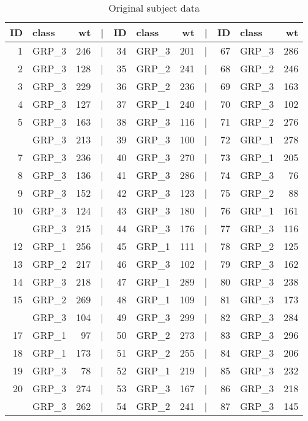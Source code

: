 \documentclass[smallextended]{svjour3}       %
\begin{document}
\begin{table}

\caption{\label{tab:subject-weights}Original subject data}
\centering
\begin{tabular}[t]{rlrlrlrlrlr}
\toprule
ID & class & wt & | & ID & class & wt & | & ID & class & wt\\
\midrule
1 & GRP\_3 & 246 & | & 34 & GRP\_3 & 201 & | & 67 & GRP\_3 & 286\\
2 & GRP\_3 & 128 & | & 35 & GRP\_2 & 241 & | & 68 & GRP\_2 & 246\\
3 & GRP\_3 & 229 & | & 36 & GRP\_2 & 236 & | & 69 & GRP\_3 & 163\\
4 & GRP\_3 & 127 & | & 37 & GRP\_1 & 240 & | & 70 & GRP\_3 & 102\\
5 & GRP\_3 & 163 & | & 38 & GRP\_3 & 116 & | & 71 & GRP\_2 & 276\\
\addlinespace
6 & GRP\_3 & 213 & | & 39 & GRP\_3 & 100 & | & 72 & GRP\_1 & 278\\
7 & GRP\_3 & 236 & | & 40 & GRP\_3 & 270 & | & 73 & GRP\_1 & 205\\
8 & GRP\_3 & 136 & | & 41 & GRP\_3 & 286 & | & 74 & GRP\_3 & 76\\
9 & GRP\_3 & 152 & | & 42 & GRP\_3 & 123 & | & 75 & GRP\_2 & 88\\
10 & GRP\_3 & 124 & | & 43 & GRP\_3 & 180 & | & 76 & GRP\_1 & 161\\
\addlinespace
11 & GRP\_3 & 215 & | & 44 & GRP\_3 & 176 & | & 77 & GRP\_3 & 116\\
12 & GRP\_1 & 256 & | & 45 & GRP\_1 & 111 & | & 78 & GRP\_2 & 125\\
13 & GRP\_2 & 217 & | & 46 & GRP\_3 & 102 & | & 79 & GRP\_3 & 162\\
14 & GRP\_3 & 218 & | & 47 & GRP\_1 & 289 & | & 80 & GRP\_3 & 238\\
15 & GRP\_2 & 269 & | & 48 & GRP\_1 & 109 & | & 81 & GRP\_3 & 173\\
\addlinespace
16 & GRP\_3 & 104 & | & 49 & GRP\_3 & 299 & | & 82 & GRP\_3 & 284\\
17 & GRP\_1 & 97 & | & 50 & GRP\_2 & 273 & | & 83 & GRP\_3 & 296\\
18 & GRP\_1 & 173 & | & 51 & GRP\_2 & 255 & | & 84 & GRP\_3 & 206\\
19 & GRP\_3 & 78 & | & 52 & GRP\_1 & 219 & | & 85 & GRP\_3 & 232\\
20 & GRP\_3 & 274 & | & 53 & GRP\_3 & 167 & | & 86 & GRP\_3 & 218\\
\addlinespace
21 & GRP\_3 & 262 & | & 54 & GRP\_2 & 241 & | & 87 & GRP\_3 & 145\\

\end{tabular}
\end{table}
\end{document}
